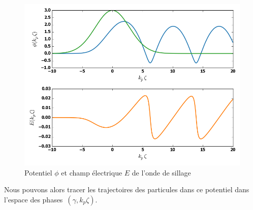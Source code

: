 \documentclass[a4paper]{book}
\begin{document}
\begin{figure}[!htbp]
\begin{center}
\includegraphics[width=12cm]{1D_Field_and_Potential.png}
\end{center}
\caption{Potentiel $\phi$ et champ électrique $E$ de l'onde de sillage}
\label{fig:1D_pot_field}
\end{figure}

Nous pouvons alors tracer les trajectoires des particules dans ce potentiel dans l'espace des phases~$(\gamma, k_p\zeta)$.



\printbibliography[title={Bibliographie}]



%
%
\end{document}
